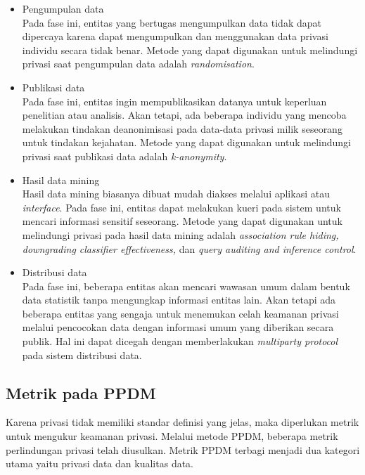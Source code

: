 \begin{itemize}	

\item Pengumpulan data\\
Pada fase ini, entitas yang bertugas mengumpulkan data tidak dapat dipercaya karena dapat mengumpulkan dan menggunakan data privasi individu secara tidak benar. Metode yang dapat digunakan untuk melindungi privasi saat pengumpulan data adalah {\it randomisation}.

\item Publikasi data\\
Pada fase ini, entitas ingin mempublikasikan datanya untuk keperluan penelitian atau analisis. Akan tetapi, ada beberapa individu yang mencoba melakukan tindakan deanonimisasi pada data-data privasi milik seseorang untuk tindakan kejahatan. Metode yang dapat digunakan untuk melindungi privasi saat publikasi data adalah {\it k-anonymity}.

\item Hasil data mining\\
Hasil data mining biasanya dibuat mudah diakses melalui aplikasi atau {\it interface}. Pada fase ini, entitas dapat melakukan kueri pada sistem untuk mencari informasi sensitif seseorang. Metode yang dapat digunakan untuk melindungi privasi pada hasil data mining adalah {\it association rule hiding, downgrading classifier effectiveness,} dan {\it query auditing and inference control}.

\item Distribusi data\\
Pada fase ini, beberapa entitas akan mencari wawasan umum dalam bentuk data statistik tanpa mengungkap informasi entitas lain. Akan tetapi ada beberapa entitas yang sengaja  untuk menemukan celah keamanan privasi melalui pencocokan data dengan informasi umum yang diberikan secara publik. Hal ini dapat dicegah dengan memberlakukan {\it multiparty protocol} pada sistem distribusi data.

\end{itemize}

\subsection{Metrik pada PPDM}
Karena privasi tidak memiliki standar definisi yang jelas, maka diperlukan metrik untuk mengukur keamanan privasi. Melalui metode PPDM, beberapa metrik perlindungan privasi telah diusulkan. Metrik PPDM terbagi menjadi dua kategori utama yaitu privasi data dan kualitas data. \\

